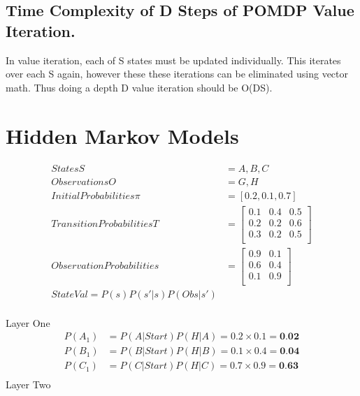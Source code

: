 \documentclass[a4paper]{article}
\begin{document}
\subsection{Time Complexity of D Steps of POMDP Value Iteration.}
\label{sec-4-2}
In value iteration, each of S states must be updated individually. This iterates over each S again, however these
these iterations can be eliminated using vector math. Thus doing a depth D value iteration should be O(DS).
\section{Hidden Markov Models}
\label{sec-5}
\begin{align*}
    States S &= {A, B, C} \\
    Observations O &= {G, H} \\
    Initial Probabilities \pi &= \left[ 0.2, 0.1, 0.7 \right] \\
    Transition Probabilities T &=
          \begin{bmatrix}
                    0.1 & 0.4 & 0.5 \\
                    0.2 & 0.2 & 0.6 \\
                    0.3 & 0.2 & 0.5 \\
          \end{bmatrix}\\
   Observation Probabilities &=
          \begin{bmatrix}
                    0.9 & 0.1 \\
                    0.6 & 0.4 \\
                    0.1 & 0.9 \\
          \end{bmatrix} \\
StateVal = P(s)P(s' | s)P(Obs | s')
\end{align*}
\\
Layer One\\
\begin{align*}
     P(A_1) &= P(A | Start) P(H | A) = 0.2 \times 0.1 = \textbf{0.02}\\
     P(B_1) &= P(B | Start) P(H | B) = 0.1 \times 0.4 = \textbf{0.04}\\
     P(C_1) &= P(C | Start) P(H | C) = 0.7 \times 0.9 = \textbf{0.63}\\
\end{align*}
Layer Two\\
\end{document}

